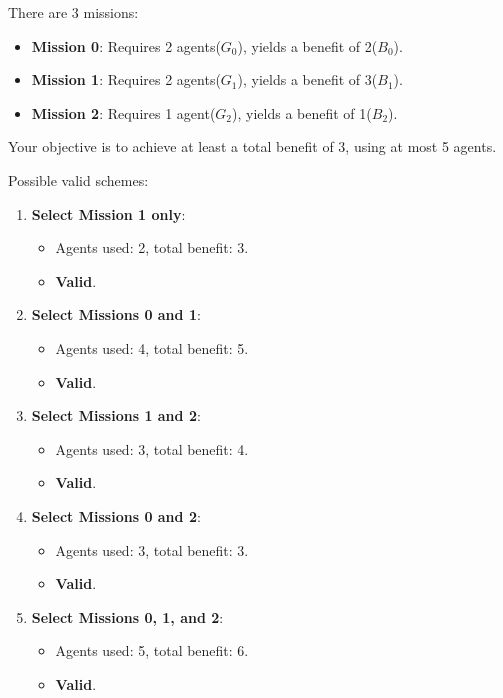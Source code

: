 \documentclass[12pt,a4paper]{article}
\begin{document}
There are 3 missions:
\begin{itemize}
 \item \textbf{Mission 0}: Requires 2 agents($G_0$), yields a benefit of 2($B_0$).
 \item \textbf{Mission 1}: Requires 2 agents($G_1$), yields a benefit of 3($B_1$).
 \item \textbf{Mission 2}: Requires 1 agent($G_2$), yields a benefit of 1($B_2$).
\end{itemize}

\noindent
Your objective is to achieve at least a total benefit of \( 3 \), using at most 5 agents.

\noindent
Possible valid schemes:
\begin{enumerate}
 \item \textbf{Select Mission 1 only}:
  \begin{itemize}
   \item Agents used: 2, total benefit: 3.
   \item \textbf{Valid}.
  \end{itemize}

 \item \textbf{Select Missions 0 and 1}:
  \begin{itemize}
   \item Agents used: 4, total benefit: 5.
   \item \textbf{Valid}.
  \end{itemize}

 \item \textbf{Select Missions 1 and 2}:
  \begin{itemize}
   \item Agents used: 3, total benefit: 4.
   \item \textbf{Valid}.
  \end{itemize}

 \item \textbf{Select Missions 0 and 2}:
  \begin{itemize}
   \item Agents used: 3, total benefit: 3.
   \item \textbf{Valid}.
  \end{itemize}

 \item \textbf{Select Missions 0, 1, and 2}:
  \begin{itemize}
   \item Agents used: 5, total benefit: 6.
   \item \textbf{Valid}.
  \end{itemize}
\end{enumerate}
\end{document}
